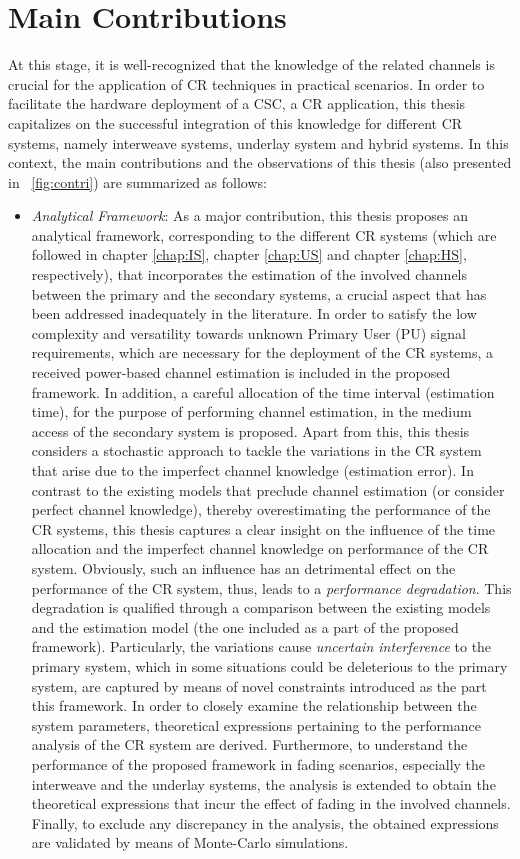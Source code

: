 \section{Main Contributions}
At this stage, it is well-recognized that the knowledge of the related channels is crucial for the application of CR techniques in practical scenarios. In order to facilitate the hardware deployment of a CSC, a CR application, this thesis capitalizes on the successful integration of this knowledge for different CR systems, namely interweave systems, underlay system and hybrid systems. In this context, the main contributions and the observations of this thesis (also presented in \figurename~\ref{fig:contri}) are summarized as follows:
\begin{itemize}
\item \textit{Analytical Framework}: 
As a major contribution, this thesis proposes an analytical framework, corresponding to the different CR systems (which are followed in chapter \ref{chap:IS}, chapter \ref{chap:US} and chapter \ref{chap:HS}, respectively), that incorporates the estimation of the involved channels between the primary and the secondary systems, a crucial aspect that has been addressed inadequately in the literature. In order to satisfy the low complexity and versatility towards unknown Primary User (PU) signal requirements, which are necessary for the deployment of the CR systems, a received power-based channel estimation is included in the proposed framework. In addition, a careful allocation of the time interval (estimation time), for the purpose of performing channel estimation, in the medium access of the secondary system is proposed. Apart from this, this thesis considers a stochastic approach to tackle the variations in the CR system that arise due to the imperfect channel knowledge (estimation error). In contrast to the existing models that preclude channel estimation (or consider perfect channel knowledge), thereby overestimating the performance of the CR systems, this thesis captures a clear insight on the influence of the time allocation and the imperfect channel knowledge on performance of the CR system. Obviously, such an influence has an detrimental effect on the performance of the CR system, thus, leads to a \textit{performance degradation}. This degradation is qualified through a comparison between the existing models and the estimation model (the one included as a part of the proposed framework). Particularly, the variations cause \textit{uncertain interference} to the primary system, which in some situations could be deleterious to the primary system, are captured by means of novel constraints introduced as the part this framework. In order to closely examine the relationship between the system parameters, theoretical expressions pertaining to the performance analysis of the CR system are derived. Furthermore, to understand the performance of the proposed framework in fading scenarios, especially the interweave and the underlay systems, the analysis is extended to obtain the theoretical expressions that incur the effect of fading in the involved channels. Finally, to exclude any discrepancy in the analysis, the obtained expressions are validated by means of Monte-Carlo simulations. 

\end{itemize}
